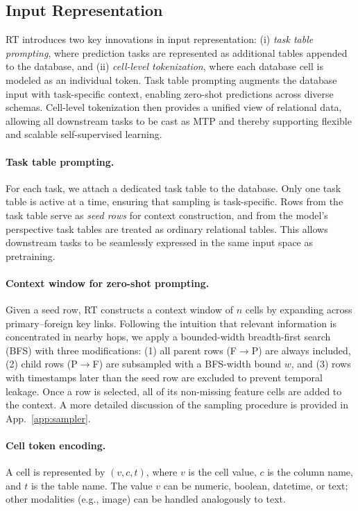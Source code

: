 \subsection{Input Representation}
\label{subsec:input-representation}
RT introduces two key innovations in input representation:  
(i) \textit{task table prompting}, where prediction tasks are represented as additional tables appended to the database, and  
(ii) \textit{cell-level tokenization}, where each database cell is modeled as an individual token.  
Task table prompting augments the database input with task-specific context, enabling zero-shot predictions across diverse schemas.  
Cell-level tokenization then provides a unified view of relational data, allowing all downstream tasks to be cast as MTP and thereby supporting flexible and scalable self-supervised learning.
\paragraph{Task table prompting.}
For each task, we attach a dedicated task table to the database. Only one task table is active at a time, ensuring that sampling is task-specific. Rows from the task table serve as \emph{seed rows} for context construction, and from the model’s perspective task tables are treated as ordinary relational tables. This allows downstream tasks to be seamlessly expressed in the same input space as pretraining. 

\paragraph{Context window for zero-shot prompting.}
Given a seed row, RT constructs a context window of $n$ cells by expanding across primary–foreign key links. Following the intuition that relevant information is concentrated in nearby hops, we apply a bounded-width breadth-first search (BFS) with three modifications:  
(1) all parent rows (F$\to$P) are always included,  
(2) child rows (P$\to$F) are subsampled with a BFS-width bound $w$, and  
(3) rows with timestamps later than the seed row are excluded to prevent temporal leakage.  
Once a row is selected, all of its non-missing feature cells are added to the context. A more detailed discussion of the sampling procedure is provided in App.~\ref{app:sampler}.

\paragraph{Cell token encoding.}
A cell is represented by $(v, c, t)$, where $v$ is the cell value, $c$ is the column name, and $t$ is the table name. The value $v$ can be numeric, boolean, datetime, or text; other modalities (e.g., image) can be handled analogously to text.

